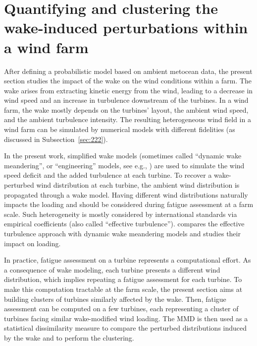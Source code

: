 \section{Quantifying and clustering the wake-induced perturbations within a wind farm}\label{sec:wake_clust}
After defining a probabilistic model based on ambient metocean data, the present section studies the impact of the wake on the wind conditions within a farm. 
The wake arises from extracting kinetic energy from the wind, leading to a decrease in wind speed and an increase in turbulence downstream of the turbines. 
In a wind farm, the wake mostly depends on the turbines' layout, the ambient wind speed, and the ambient turbulence intensity. 
The resulting heterogeneous wind field in a wind farm can be simulated by numerical models with different fidelities (as discussed in Subsection~\ref{sec:222}). 

In the present work, simplified wake models (sometimes called ``dynamic wake meandering'', or ``engineering'' models, see e.g., \citealp{doubrawa_2020_benchmark}) are used to simulate the wind speed deficit and the added turbulence at each turbine. 
To recover a wake-perturbed wind distribution at each turbine, the ambient wind distribution is propagated through a wake model. 
Having different wind distributions naturally impacts the loading and should be considered during fatigue assessment at a farm scale. 
Such heterogeneity is mostly considered by international standards via empirical coefficients (also called ``effective turbulence''). 
\citet{doubrawa_2023} compares the effective turbulence approach with dynamic wake meandering models and studies their impact on loading. 

In practice, fatigue assessment on a turbine represents a computational effort. 
As a consequence of wake modeling, each turbine presents a different wind distribution, which implies repeating a fatigue assessment for each turbine. 
To make this computation tractable at the farm scale, the present section aims at building clusters of turbines similarly affected by the wake. 
Then, fatigue assessment can be computed on a few turbines, each representing a cluster of turbines facing similar wake-modified wind loading. 
The MMD is then used as a statistical dissimilarity measure to compare the perturbed distributions induced by the wake and to perform the clustering. 

